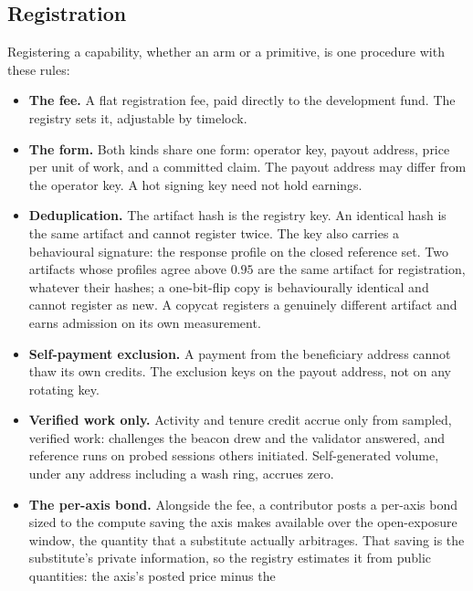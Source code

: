 \documentclass[11pt]{article}
\begin{document}
\subsection{Registration}

Registering a capability, whether an arm or a primitive, is
one procedure with these rules:

\begin{itemize}
    \item \textbf{The fee.} A flat registration fee, paid directly to
          the development fund. The registry sets it, adjustable by
          timelock.
    \item \textbf{The form.} Both kinds share one form: operator key,
          payout address, price per unit of work, and a committed claim. The
          payout address may differ from the operator key. A hot signing
          key need not hold earnings.
    \item \textbf{Deduplication.} The artifact hash is the registry
          key. An identical hash is the same artifact and cannot register
          twice. The key also carries a behavioural signature: the
          response profile on the closed reference set. Two artifacts whose
          profiles agree above $0.95$ are the same artifact for
          registration, whatever their hashes; a one-bit-flip copy is
          behaviourally identical and cannot register as new. A copycat
          registers a genuinely different artifact and earns admission on
          its own measurement.
    \item \textbf{Self-payment exclusion.} A payment from the
          beneficiary address cannot thaw its own credits. The exclusion
          keys on the payout address, not on any rotating key.
    \item \textbf{Verified work only.} Activity and tenure
          credit accrue only from sampled, verified work: challenges the
          beacon drew and the validator answered, and reference runs on
          probed sessions others initiated. Self-generated volume, under
          any address including a wash ring, accrues zero.
    \item \textbf{The per-axis bond.} Alongside the fee, a
          contributor posts a per-axis bond sized to the compute saving the
          axis makes available over the open-exposure window, the
          quantity that a substitute actually arbitrages. That saving is the
          substitute's private information, so the registry estimates it
          from public quantities: the axis's posted price minus the

\end{itemize}
\end{document}
